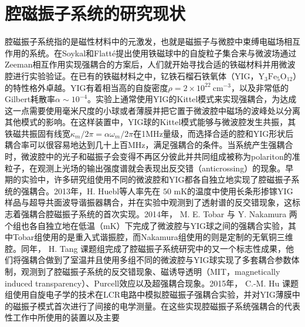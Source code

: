 \section{腔磁振子系统的研究现状}
腔磁振子系统指的是磁性材料中的元激发，也就是磁振子与微腔中束缚电磁场相互作用的系统。在Soykal和Flatt\'e提出使用铁磁球中的自旋粒子集合来与微波场通过Zeeman相互作用实现强耦合的方案后，人们就开始寻找合适的铁磁材料并用微波腔进行实验验证。在已有的铁磁材料之中，钇铁石榴石铁氧体（YIG，$\mathrm{Y_3Fe_5O_{12}}$）的特性格外卓越。YIG有着相当高的自旋密度$\rho=2\times10^{22}~\mathrm{cm}^{-3}$，以及非常低的Gilbert耗散率$\alpha \sim 10^{-4}$。实验上通常使用YIG的Kittel模式来实现强耦合，为达成这一点需要使用毫米尺度的小球或者薄膜并把它置于微波腔中磁场的波峰处以分离其他模式的影响。在这样装置中，YIG球的Kittel模式能够与微波腔发生共振，其铁磁共振固有线宽$\kappa_m/2\pi=\alpha \omega_m/2\pi$在1MHz量级，而选择合适的腔和YIG形状后耦合率可以很容易地达到几十上百MHz，满足强耦合的条件。当系统产生强耦合时，微波腔中的光子和磁振子会变得不再区分彼此并共同组成被称为polariton的准粒子，在观测上光场的输出强度谱就会表现出反交错（anticrossing）的现象。早期的实验中，许多研究组使用不同的微波腔和YIG都各自独立地实现了腔磁振子系统的强耦合。2013年，H. Huebl等人率先在 $50$ mK的温度中使用长条形掺镓YIG样品与超导共面波导谐振器耦合，并在实验中观测到了透射谱的反交错现象\cite{PhysRevLett.111.127003Huebl}，这标志着强耦合腔磁振子系统的首次实现。2014年， M. E. Tobar 与 Y. Nakamura 两个组也各自独立地在低温（mK）下完成了微波腔与YIG球之间的强耦合实验，其中Tobar组使用的是重入式谐振腔\cite{PhysRevApplied.2.054002Tobar}，而Nakamura组使用的则是定制的无氧铜三维腔\cite{PhysRevLett.113.083603Nakamura}。同年， H. Tang 课题组完成了腔磁振子系统研究中的又一个标志性成果，他们将强耦合做到了室温并且使用多组不同的微波腔与YIG球实现了多套耦合参数体制，观测到了腔磁振子系统的反交错现象、磁诱导透明（MIT，magnetically induced transparency）、Purcell效应以及超强耦合现象\cite{PhysRevLett.113.156401Tang}。2015年， C.-M. Hu 课题组使用自旋电子学的技术在LCR电路中模拟腔磁振子强耦合实验，并对YIG薄膜中的磁振子模式首次进行了间接的电学测量\cite{PhysRevLett.114.227201Hu}。在这些实现腔磁振子系统强耦合的代表性工作中所使用的装置以及主要
